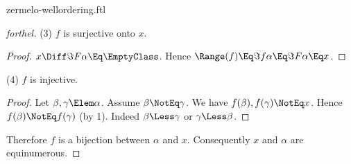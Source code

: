 \documentclass{stex}
\begin{document}
\begin{smodule}{zermelo-wellordering.ftl}
\begin{proof}[forthel]
  (3) $f$ is surjective onto $x$.
  \begin{proof}
    $x \Diff \Im{F}{\alpha} \Eq \EmptyClass$.
    Hence $\Range(f)
      \Eq \Im{f}{\alpha}
      \Eq \Im{F}{\alpha}
      \Eq x$.
  \end{proof}

  (4) $f$ is injective.
  \begin{proof}
    Let $\beta, \gamma \Elem \alpha$.
    Assume $\beta \NotEq \gamma$.
    We have $f(\beta), f(\gamma) \NotEq x$.
    Hence $f(\beta) \NotEq f(\gamma)$ (by 1).
    Indeed $\beta \Less \gamma$ or $\gamma \Less \beta$.
  \end{proof}

  Therefore $f$ is a bijection between $\alpha$ and $x$.
  Consequently $x$ and $\alpha$ are equinumerous.
\end{proof}

\printbibliography
{}

\end{smodule}
\end{document}
